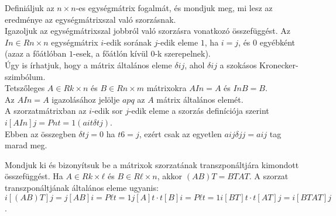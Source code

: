 \begin{frame}
  \begin{tcolorbox}[title={7. (4p)}]
      Deﬁniáljuk az $n × n$-es egységmátrix fogalmát, és mondjuk meg, mi lesz az eredménye az egységmátrixszal való szorzásnak.\\
      
      Igazoljuk az egységmátrixszal jobbról való szorzásra vonatkozó összefüggést. 
  \tcblower
    Az $In ∈ Rn×n$ egységmátrix $i$-edik sorának $j$-edik eleme $1$, ha $i = j$, és $0$ egyébként (azaz a főátlóban $1$-esek, a főátlón kívül $0$-k szerepelnek).\\
    
    Úgy is írhatjuk, hogy a mátrix általános eleme $δij$, ahol $δij$ a szokásos Kronecker-szimbólum.\\
    
    Tetszőleges $A ∈ Rk×n$ és $B ∈ Rn×m$ mátrixokra $AIn = A$ és $InB = B$.\\
    
    Az $AIn = A$ igazolásához jelölje $apq$ az $A$ mátrix általános elemét.\\
    
    A szorzatmátrixban az $i$-edik sor $j$-edik eleme a szorzás deﬁníciója szerint $i[AIn]j = Pn t=1(aitδtj)$.\\
    
    Ebben az összegben $δtj = 0$ ha $t 6= j$, ezért csak az egyetlen $aijδjj = aij$ tag marad meg.
  \end{tcolorbox}
\end{frame}


\begin{frame}
  \begin{tcolorbox}[title={8. (4p)}]
       Mondjuk ki és bizonyítsuk be a mátrixok szorzatának transzponáltjára kimondott összefüggést. 
  \tcblower
    Ha $A ∈ Rk×ℓ$ és $B ∈ Rℓ×n$, akkor $(AB)T = BTAT$. A szorzat transzponáltjának általános eleme ugyanis: $i[(AB)T]j = j[AB]i = Pℓ t=1 j[A]t · t[B]i = Pℓ t=1 i[BT]t · t[AT]j = i[BTAT]j$.
  \end{tcolorbox}
\end{frame}

